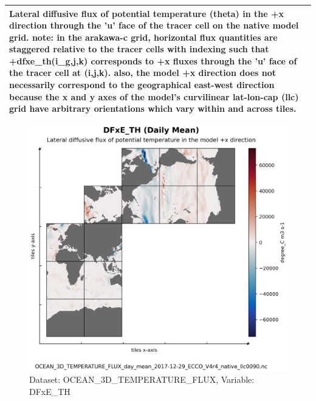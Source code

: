 \begin{longtable}{|m{}|m{}|m{}|m{}|}
\multicolumn{4}{|p{1\textwidth}|}{Lateral diffusive flux of potential temperature (theta) in the +x direction through the 'u' face of the tracer cell on the native model grid. note: in the arakawa-c grid, horizontal flux quantities are staggered relative to the tracer cells with indexing such that +dfxe\_th(i\_g,j,k) corresponds to +x fluxes through the 'u' face of the tracer cell at (i,j,k). also, the model +x direction does not necessarily correspond to the geographical east-west direction because the x and y axes of the model's curvilinear lat-lon-cap (llc) grid have arbitrary orientations which vary within and across tiles.} \\ \hline
\end{longtable}

\begin{figure}[H]
\centering
\includegraphics[scale=0.55]{../images/plots/native_plots/Ocean_Three-Dimensional_Potential_Temperature_Fluxes/DFxE_TH.png}
\caption{Dataset: OCEAN\_3D\_TEMPERATURE\_FLUX, Variable: DFxE\_TH}
\label{tab:table-OCEAN_3D_TEMPERATURE_FLUX_DFxE_TH-Plot}
\end{figure}
\pagebreak
